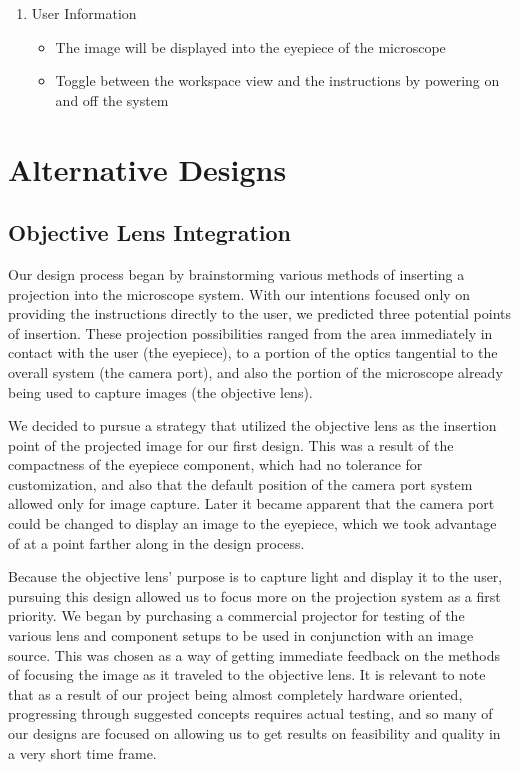 \documentclass[12pt,a4paper]{article}
\begin{document}
\begin{appendices}
\begin{enumerate}
	\item User Information
		\begin{itemize}
		
			\item The image will be displayed into the eyepiece of the microscope
			\item Toggle between the workspace view and the instructions by powering on and off the system
		\end{itemize}
\end{enumerate}

\section{Alternative Designs}
\subsection{Objective Lens Integration}
Our design process began by brainstorming various methods of inserting a projection into the microscope system.  With our intentions focused only on providing the instructions directly to the user, we predicted three potential points of insertion.  These projection possibilities ranged from the area immediately in contact with the user (the eyepiece), to a portion of the optics tangential to the overall system (the camera port), and also the portion of the microscope already being used to capture images (the objective lens).

We decided to pursue a strategy that utilized the objective lens as the insertion point of the projected image for our first design.  This was a result of the compactness of the eyepiece component, which had no tolerance for customization, and also that the default position of the camera port system allowed only for image capture.  Later it became apparent that the camera port could be changed to display an image to the eyepiece, which we took advantage of at a point farther along in the design process.
	
Because the objective lens’ purpose is to capture light and display it to the user, pursuing this design allowed us to focus more on the projection system as a first priority.  We began by purchasing a commercial projector for testing of the various lens and component setups to be used in conjunction with an image source.  This was chosen as a way of getting immediate feedback on the methods of focusing the image as it traveled to the objective lens.  It is relevant to note that as a result of our project being almost completely hardware oriented, progressing through suggested concepts requires actual testing, and so many of our designs are focused on allowing us to get results on feasibility and quality in a very short time frame.


\end{appendices}
\end{document}
